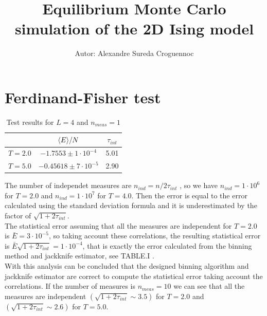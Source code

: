 \documentclass[article]{revtex4}
\newcommand{\qdist}[1]{\ifmmode\langle#1\rangle\else\textlangle#1\textrangle\fi}
\begin{document}


\pagestyle{fancy}


\title{Equilibrium Monte Carlo simulation of the 2D Ising model}
\author{Autor: Alexandre Sureda Croguennoc}


\maketitle


\section{Ferdinand-Fisher test}

\begin{table}[h!]
\center
\begin{tabular}{|c|c|c|}
\hline
&$\qdist{E}/N $ & $ \tau_{int} $\\
\hline
$T = 2.0$ &$-1.7553 \pm 1 \cdot10^{-4}$&5.01\\
\hline
$T = 5.0$&$-0.45618 \pm 7 \cdot10^{-5}$&2.90\\
\hline
\end{tabular}
\center
\caption{Test results for $L = 4$ and $n_{meas}=1$}
\end{table}

The number of independet measures are $n_{ind}=n/2 \tau_{int} $ , so we have $n_{ind}=1 \cdot10^{6}$ for $T = 2.0$ and  $n_{ind}=1 \cdot10^{7}$ for $T = 4.0$. Then the error is
equal to the error calculated using the standard deviation formula and it
is underestimated by the factor of $\sqrt{1+2\tau_{int}}$.\\
 The statistical error assuming that all the measures are independent for $T=2.0$ is $\bar{E} =3 \cdot10^{-5} $, so taking account these correlations, the resulting statistical error is $\bar{E} \sqrt{1+2\tau_{int}} =1 \cdot10^{-4} $, that is exactly the error calculated from the binning method and jackknife estimator, see TABLE.I . \\
With this analysis can be concluded that the designed binning algorithm and jackknife estimator are correct to compute the statistical error taking account the correlations. If the number of measures is $n_{meas}=10$ we can see that all the measures are independent $( \sqrt{1+2\tau_{int}} \sim 3.5)$ for $T=2.0$ and $( \sqrt{1+2\tau_{int}} \sim 2.6)$ for $T=5.0$.
\\
\end{document}
